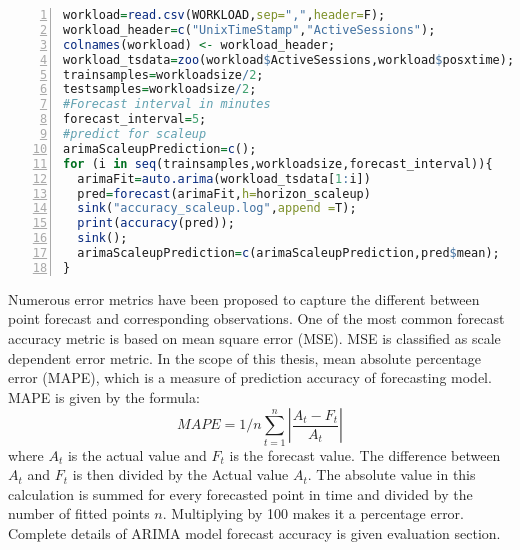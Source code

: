 \begin{lstlisting}[language=R,caption=ARIMA Scaleup Model,label=list:predscaleup,numbers=left,frame=single,fontadjust=true,breaklines,basicstyle=\small]
workload=read.csv(WORKLOAD,sep=",",header=F);
workload_header=c("UnixTimeStamp","ActiveSessions");
colnames(workload) <- workload_header;
workload_tsdata=zoo(workload$ActiveSessions,workload$posxtime);
trainsamples=workloadsize/2;
testsamples=workloadsize/2;
#Forecast interval in minutes
forecast_interval=5;
#predict for scaleup
arimaScaleupPrediction=c();
for (i in seq(trainsamples,workloadsize,forecast_interval)){
  arimaFit=auto.arima(workload_tsdata[1:i])
  pred=forecast(arimaFit,h=horizon_scaleup)
  sink("accuracy_scaleup.log",append =T);
  print(accuracy(pred));
  sink();
  arimaScaleupPrediction=c(arimaScaleupPrediction,pred$mean);
}
\end{lstlisting}
Numerous error metrics have been proposed to capture the different between point forecast and corresponding observations. One of the most common forecast accuracy metric is based on mean square error (MSE)\cite{makridakis2008forecasting}. MSE is classified as scale dependent error metric. In the scope of this thesis, mean absolute percentage error (MAPE)\cite{makridakis2008forecasting}, which is a measure of prediction accuracy of forecasting model. MAPE is given by the formula:
\begin{equation}
  MAPE = 1/n \sum_{t=1}^{n} |\frac{A_{t}-F_{t}}{A_{t}}|
\end{equation}
where \(A_{t}\) is the actual value and \(F_{t}\) is the forecast value. The difference between \(A_{t}\) and \(F_{t}\) is then divided by the Actual value \(A_{t}\). The absolute value in this calculation is summed for every forecasted point in time and divided by the number of fitted points \(n\). Multiplying by 100 makes it a percentage error. Complete details of ARIMA model forecast accuracy is given evaluation section.
